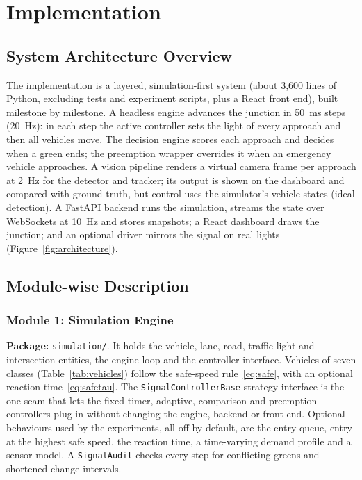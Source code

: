 \chapter{Implementation}
\label{chap:impl}

\section{System Architecture Overview}
The implementation is a layered, simulation-first system (about 3,600 lines of Python, excluding tests and experiment scripts, plus a React front end), built milestone by milestone. A headless engine advances the junction in 50~ms steps (20~Hz): in each step the active controller sets the light of every approach and then all vehicles move. The decision engine scores each approach and decides when a green ends; the preemption wrapper overrides it when an emergency vehicle approaches. A vision pipeline renders a virtual camera frame per approach at 2~Hz for the detector and tracker; its output is shown on the dashboard and compared with ground truth, but control uses the simulator's vehicle states (ideal detection). A FastAPI backend runs the simulation, streams the state over WebSockets at 10~Hz and stores snapshots; a React dashboard draws the junction; and an optional driver mirrors the signal on real lights (Figure~\ref{fig:architecture}).

\section{Module-wise Description}

\subsection{Module 1: Simulation Engine}
\textbf{Package:} \texttt{simulation/}. It holds the vehicle, lane, road, traffic-light and intersection entities, the engine loop and the controller interface. Vehicles of seven classes (Table~\ref{tab:vehicles}) follow the safe-speed rule~\eqref{eq:safe}, with an optional reaction time~\eqref{eq:safetau}. The \texttt{SignalControllerBase} strategy interface is the one seam that lets the fixed-timer, adaptive, comparison and preemption controllers plug in without changing the engine, backend or front end. Optional behaviours used by the experiments, all off by default, are the entry queue, entry at the highest safe speed, the reaction time, a time-varying demand profile and a sensor model. A \texttt{SignalAudit} checks every step for conflicting greens and shortened change intervals.

